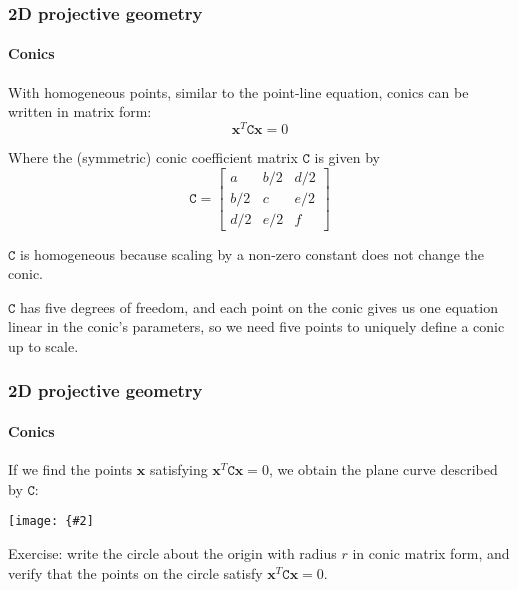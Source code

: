 \documentclass[aspectratio=169]{beamer}
\renewcommand{\vec}[1]{\boldsymbol{#1}}
\newcommand{\mat}[1]{\mathtt{#1}}
\newcommand{\myfig}[3]{\centerline{\texttt{[image: \{\#2]}}}
    \centerline{\scriptsize #3}}
\begin{document}
\begin{frame}
\frametitle{2D projective geometry}
\framesubtitle{Conics}

With homogeneous points, similar to the point-line equation, conics
can be written in matrix form:
\begin{equation*}
\vec{x}^T\mat{C}\vec{x}=0
\end{equation*}

\medskip

Where the (symmetric) conic coefficient matrix $\mat{C}$ is given by
\begin{equation*}
\mat{C}=\begin{bmatrix}
a & b/2 & d/2 \\
b/2 & c & e/2 \\
d/2 & e/2 & f \end{bmatrix}
\end{equation*}

\medskip

$\mat{C}$ is \alert{homogeneous} because scaling by a non-zero
constant does not change the conic.

\medskip

$\mat{C}$ has five degrees of freedom, and each point on the conic
gives us one equation linear in the conic's parameters, so we need
five points to uniquely define a conic up to scale.

\end{frame}

\begin{frame}
\frametitle{2D projective geometry}
\framesubtitle{Conics}

If we find the points $\vec{x}$ satisfying
$\vec{x}^T\mat{C}\vec{x}=0$, we obtain the plane curve described by
$\mat{C}$:

\medskip

\myfig{1.9in}{HZ-fig1-2a}{\begin{minipage}{2.5in} \centering Solution of
    $\vec{x}^T\mat{C}\vec{x}=0$\\
Hartley and Zisserman (2004), Fig.\ 2.2(a) \end{minipage}}

\medskip

\alert{Exercise}: write the circle about the origin with radius $r$ in conic
matrix form, and verify that the points on the circle satisfy
$\vec{x}^T\mat{C}\vec{x}=0$.

\end{frame}
\end{document}
